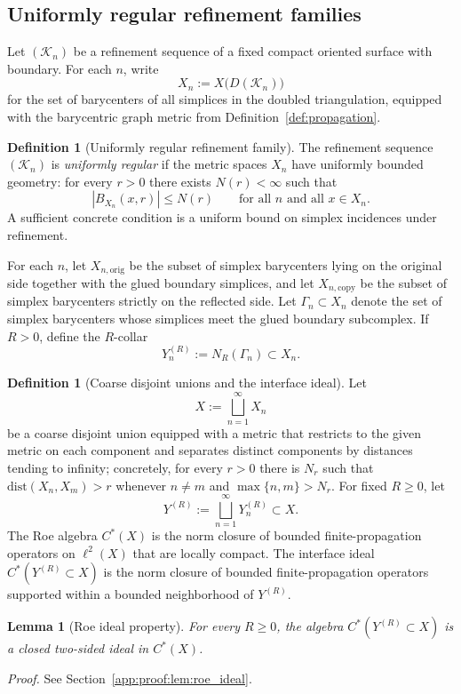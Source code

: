 \documentclass[11pt]{article}
\numberwithin{equation}{section}
\newtheorem{lemma}[theorem]{Lemma}
\theoremstyle{definition}
\newtheorem{definition}[theorem]{Definition}
\theoremstyle{remark}
\newcommand{\proofref}[1]{%
  \par\noindent\emph{Proof.} See Section~\ref{#1}.\par\medskip
}
\newcommand{\proofappendixref}[1]{\proofref{#1}}
\newcommand{\K}{\mathcal{K}}
\newcommand{\dist}{\mathrm{dist}}
\begin{document}
\subsection{Uniformly regular refinement families}

Let $(\K_n)$ be a refinement sequence of a fixed compact oriented surface with boundary. For each
$n$, write
\[
X_n:=X\bigl(D(\K_n)\bigr)
\]
for the set of barycenters of all simplices in the doubled triangulation, equipped with the
barycentric graph metric from Definition~\ref{def:propagation}.

\begin{definition}[Uniformly regular refinement family]\label{def:uniform_regular}
The refinement sequence $(\K_n)$ is \emph{uniformly regular} if the metric spaces $X_n$ have
uniformly bounded geometry: for every $r>0$ there exists $N(r)<\infty$ such that
\[
|B_{X_n}(x,r)|\le N(r)
\qquad\text{for all }n\text{ and all }x\in X_n.
\]
A sufficient concrete condition is a uniform bound on simplex incidences under refinement.
\end{definition}

For each $n$, let $X_{n,\mathrm{orig}}$ be the subset of simplex barycenters lying on the original
side together with the glued boundary simplices, and let $X_{n,\mathrm{copy}}$ be the subset of
simplex barycenters strictly on the reflected side. Let $\Gamma_n\subset X_n$ denote the set of
simplex barycenters whose simplices meet the glued boundary subcomplex. If $R>0$, define the
$R$-collar
\[
Y_n^{(R)}:=N_R(\Gamma_n)\subset X_n.
\]

\begin{definition}[Coarse disjoint unions and the interface ideal]\label{def:coarse_union}
Let
\[
X:=\bigsqcup_{n=1}^\infty X_n
\]
be a coarse disjoint union equipped with a metric that restricts to the given metric on each
component and separates distinct components by distances tending to infinity; concretely, for every
$r>0$ there is $N_r$ such that $\dist(X_n,X_m)>r$ whenever $n\neq m$ and
\(\max\{n,m\}>N_r\). For fixed $R\ge0$, let
\[
Y^{(R)}:=\bigsqcup_{n=1}^\infty Y_n^{(R)}\subset X.
\]
The Roe algebra $C^*(X)$ is the norm closure of bounded finite-propagation operators on
$\ell^2(X)$ that are locally compact. The interface ideal $C^*(Y^{(R)}\subset X)$ is the norm
closure of bounded finite-propagation operators supported within a bounded neighborhood of
$Y^{(R)}$.
\end{definition}

\begin{lemma}[Roe ideal property]\label{lem:roe_ideal}
For every $R\ge0$, the algebra $C^*(Y^{(R)}\subset X)$ is a closed two-sided ideal in $C^*(X)$.
\end{lemma}
\proofappendixref{app:proof:lem:roe_ideal}
\end{document}

